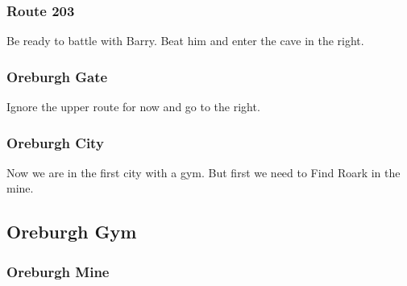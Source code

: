 \documentclass[11pt]{article}
\begin{document}



\subsubsection{Route 203}\label{subsubsec:route_203}
Be ready to battle with Barry.
Beat him and enter the cave in the right.





\subsubsection{Oreburgh Gate}\label{subsubsec:oreburgh-gate}
Ignore the upper route for now and go to the right.




\subsubsection{Oreburgh City}\label{subsubsec:oreburgh-city}
Now we are in the first city with a gym.
But first we need to Find Roark in the mine.

\subsection{Oreburgh Gym}\label{subsec:oreburgh-gym}

\subsubsection{Oreburgh Mine}\label{subsubsec:oreburgh-mine}
\end{document}
